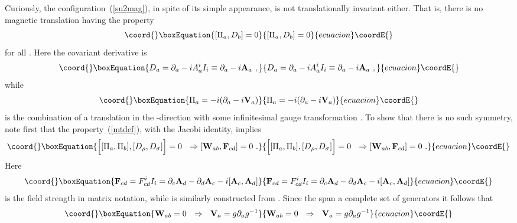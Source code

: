 \documentclass[a4paper,12pt]{article}
\begin{document}
Curiously, the configuration~(\ref{su2mag}), in spite of its simple
appearance, is not translationally invariant either.  That is, there is
no magnetic translation \coordHE{}
having the property
\begin{equation}\coord{}\boxEquation{
[\Pi_a, D_b] = 0  \label{mtdef}
}{
[\Pi_a, D_b] = 0  }{ecuacion}\coordE{}\end{equation}
for all \coordHE{}.
Here the covariant derivative is
\begin{equation}\coord{}\boxEquation{
D_a = \partial_a - i A_a^i I_i \equiv \partial_a - i {\bf A}_a
\ ,
}{
D_a = \partial_a - i A_a^i I_i \equiv \partial_a - i {\bf A}_a
\ ,
}{ecuacion}\coordE{}\end{equation}
while 
\begin{equation}\coord{}\boxEquation{
\Pi_a = -i(\partial_a - i {\bf V}_a)
}{
\Pi_a = -i(\partial_a - i {\bf V}_a)
}{ecuacion}\coordE{}\end{equation}
is the combination of a translation in the \coordHE{}-direction with some
infinitesimal gauge transformation \coordHE{}.  To show that there is
no such symmetry, note first that the property~(\ref{mtdef}), with
the Jacobi identity, implies
\begin{equation}\coord{}\boxEquation{
\Bigl[ [ \Pi_a,\Pi_b ], [D_\rho,D_\sigma] \Bigr] = 0
\ \ \Rightarrow [ {\bf W}_{ab} , {\bf F}_{cd} ] = 0\ .
}{
\Bigl[ [ \Pi_a,\Pi_b ], [D_\rho,D_\sigma] \Bigr] = 0
\ \ \Rightarrow [ {\bf W}_{ab} , {\bf F}_{cd} ] = 0\ .
}{ecuacion}\coordE{}\end{equation}
Here
\begin{equation}\coord{}\boxEquation{
{\bf F}_{cd} = { F}^i_{cd} I_i
= \partial_c {\bf A}_d - \partial_d {\bf A}_c 
- i [ {\bf A}_c, {\bf A}_d]
}{
{\bf F}_{cd} = { F}^i_{cd} I_i
= \partial_c {\bf A}_d - \partial_d {\bf A}_c 
- i [ {\bf A}_c, {\bf A}_d]
}{ecuacion}\coordE{}\end{equation}
is the
field strength in matrix notation, while \coordHE{} is similarly
constructed from \coordHE{}.  Since the \coordHE{} span a
complete set of \coordHE{} generators it follows that
\begin{equation}\coord{}\boxEquation{
{\bf W}_{ab} = 0\ \ \Rightarrow\ \ {\bf V}_a = g \partial_a g^{-1}
}{
{\bf W}_{ab} = 0\ \ \Rightarrow\ \ {\bf V}_a = g \partial_a g^{-1}
}{ecuacion}\coordE{}\end{equation}
\end{document}
